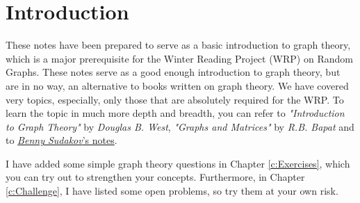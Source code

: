 \chapter{Introduction}
\label{c:introduction}
These notes have been prepared to serve as a basic introduction to graph theory, which is a major prerequisite for the Winter Reading Project (WRP) on Random Graphs. These notes serve as a good enough introduction to graph theory, but are in no way, an alternative to books written on graph theory. We have covered very topics, especially, only those that are absolutely required for the WRP. To learn the topic in much more depth and breadth, you can refer to \textit{"Introduction to Graph Theory"} by \textit{Douglas B. West}, \textit{"Graphs and Matrices"} by \textit{R.B. Bapat} and to \href{https://www2.math.ethz.ch/education/bachelor/lectures/fs2016/math/graph_theory/graph_theory_notes.pdf}{\textit{Benny Sudakov}'s notes}. 

I have added some simple graph theory questions in Chapter \ref{c:Exercises}, which you can try out to strengthen your concepts. Furthermore, in Chapter \ref{c:Challenge}, I have listed some open problems, so try them at your own risk.